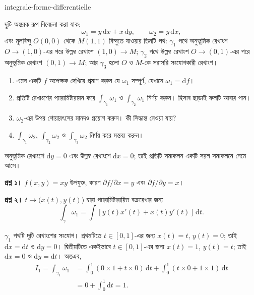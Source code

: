 
\begin{exo}{integrale-forme-differentielle}

দুটি অন্তরক রূপ বিবেচনা করা যাক:
\[
\omega_1 = y\,\mathrm{d}x + x\,\mathrm{d}y,
\qquad
\omega_2 = y\,\mathrm{d}x,
\]
এবং মূলবিন্দু $O(0,0)$ থেকে $M(1,1)$ বিন্দুতে যাওয়ার তিনটি পথ:
$\gamma_1$ পথে অনুভূমিক রেখাংশ $O\to(1,0)$-এর পরে উল্লম্ব রেখাংশ
$(1,0)\to M$; $\gamma_2$ পথে উল্লম্ব রেখাংশ $O\to(0,1)$-এর পরে অনুভূমিক
রেখাংশ $(0,1)\to M$; আর $\gamma_3$ হলো $O$ ও $M$-কে সরাসরি সংযোগকারী রেখাংশ।

\begin{enumerate}
\item এমন একটি $f$ অপেক্ষক দেখিয়ে প্রমাণ করুন যে $\omega_1$ সম্পূর্ণ, যেখানে $\omega_1=\mathrm{d}f$।
\item প্রতিটি রেখাংশের প্যারামিটারায়ন করে $\int_{\gamma_1}\omega_1$ ও $\int_{\gamma_2}\omega_1$ নির্ণয় করুন। হিসাব ছাড়াই ফলটি আবার পান।
\item $\omega_2$-এর উপর শোয়ারৎসের মানদণ্ড প্রয়োগ করুন। কী সিদ্ধান্ত নেওয়া যায়?
\item $\int_{\gamma_1}\omega_2$, $\int_{\gamma_2}\omega_2$ ও $\int_{\gamma_3}\omega_2$ নির্ণয় করে মন্তব্য করুন।
\end{enumerate}

\begin{indication}
অনুভূমিক রেখাংশে $\mathrm{d}y=0$ এবং উল্লম্ব রেখাংশে $\mathrm{d}x=0$;
তাই প্রতিটি সমাকলন একটি সরল সমাকলনে নেমে আসে।
\end{indication}

\begin{solution}
\textbf{প্রশ্ন ১।} $f(x,y)=xy$ উপযুক্ত, কারণ $\partial f/\partial x=y$ এবং $\partial f/\partial y=x$।

\textbf{প্রশ্ন ২।} $t\mapsto\bigl(x(t),y(t)\bigr)$ দ্বারা প্যারামিটারায়িত বক্ররেখার জন্য
\[
\int_\gamma\omega_1
= \int \left[y(t)x'(t)+x(t)y'(t)\right]\,\mathrm{d}t.
\]

$\gamma_1$ পথটি দুটি রেখাংশের সংযোগ। প্রথমটিতে $t\in[0,1]$-এর জন্য
$x(t)=t$, $y(t)=0$; তাই $\mathrm{d}x=\mathrm{d}t$ ও $\mathrm{d}y=0$।
দ্বিতীয়টিতে একইভাবে $t\in[0,1]$-এর জন্য $x(t)=1$, $y(t)=t$; তাই
$\mathrm{d}x=0$ ও $\mathrm{d}y=\mathrm{d}t$। অতএব,
\[
\begin{aligned}
I_1
= \int_{\gamma_1}\omega_1
&= \int_0^1\left(0\times 1+t\times 0\right)\,\mathrm{d}t
 + \int_0^1\left(t\times 0+1\times 1\right)\,\mathrm{d}t \\
&= 0+\int_0^1\mathrm{d}t = 1.
\end{aligned}
\]


\end{solution}
\end{exo}
